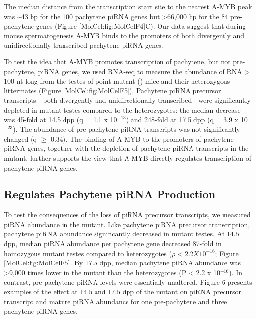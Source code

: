     The median distance from the transcription start site to the nearest A-MYB peak was \textasciitilde43 bp for the 100 pachytene piRNA genes but >66,000 bp for the 84 pre-pachytene genes (Figure \ref{MolCel:fig:MolCelF4}C). Our data suggest that during mouse spermatogenesis A-MYB binds to the promoters of both divergently and unidirectionally transcribed pachytene piRNA genes.

    To test the idea that A-MYB promotes transcription of pachytene, but not pre-pachytene, piRNA genes, we used RNA-seq to measure the abundance of RNA > 100 nt long from the testes of \amyb{} point-mutant (\mybrepro) mice and their heterozygous littermates (Figure \ref{MolCel:fig:MolCelF5}). Pachytene piRNA precursor transcripts—both divergently and unidirectionally transcribed—were significantly depleted in \amyb{} mutant testes compared to the heterozygotes: the median decrease was 45-fold at 14.5 dpp (q = 1.1 x 10$^{-13}$) and 248-fold at 17.5 dpp (q = 3.9 x 10$^{-23}$). The abundance of pre-pachytene piRNA transcripts was not significantly changed (q $\ge $ 0.34). The binding of A-MYB to the promoters of pachytene piRNA genes, together with the depletion of pachytene piRNA transcripts in the \amyb{} mutant, further supports the view that A-MYB directly regulates transcription of pachytene piRNA genes.

  \subsection{\amyb{} Regulates Pachytene piRNA Production}
    \label{MolCel:subsec:A-Myb regulates pachytene piRNA production}

    To test the consequences of the loss of piRNA precursor transcripts, we measured piRNA abundance in the \amyb{} mutant. Like pachytene piRNA precursor transcription, pachytene piRNA abundance significantly decreased in mutant testes. At 14.5 dpp, median piRNA abundance per pachytene gene decreased 87-fold in \amyb{} homozygous mutant testes compared to heterozygotes ($\rho < 2.2 X 10^{-16}$; Figure \ref{MolCel:fig:MolCelF5}. By 17.5 dpp, median pachytene piRNA abundance was >9,000 times lower in the \amyb{} mutant than the heterozygotes (P < 2.2 x 10$^{-16}$). In contrast, pre-pachytene piRNA levels were essentially unaltered. Figure 6 presents examples of the effect at 14.5 and 17.5 dpp of the \amyb{} mutant on piRNA precursor transcript and mature piRNA abundance for one pre-pachytene and three pachytene piRNA genes.

